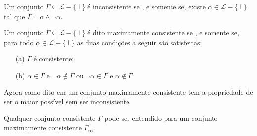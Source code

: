 \begin{definicao}\label{def:ConjuntoInconsistente}
  Um conjunto $\Gamma \subseteq \mathcal{L} - \{\bot\}$ é inconsistente se , e somente se, existe $\alpha \in \mathcal{L} - \{\bot\}$ tal que $\Gamma \vdash \alpha \land \neg \alpha$.
\end{definicao}

\begin{definicao}\label{def:ConjuntoMaxConsistente}
  Um conjunto $\Gamma \subseteq \mathcal{L} - \{\bot\}$ é dito maximamente consistente se , e somente se, para todo $\alpha \in \mathcal{L} - \{\bot\}$ as duas condições a seguir são satisfeitas:
  \begin{itemize}
      \item[(a)] $\Gamma$ é consistente;
      \item[(b)] $\alpha \in \Gamma$ e $\neg \alpha \notin \Gamma$ ou $\neg \alpha \in \Gamma$ e $\alpha \notin \Gamma$.
  \end{itemize}
\end{definicao}

Agora como dito em \cite{joaoPavao2014} um conjunto maximamente consistente tem a propriedade de ser o maior possível sem ser inconsistente. 

\begin{teorema}\label{teo:ExtensaomaximamenteConsistente}
  Qualquer conjunto consistente $\Gamma$ pode ser entendido para um conjunto maximamente consistente $\Gamma_\infty$.
\end{teorema}

